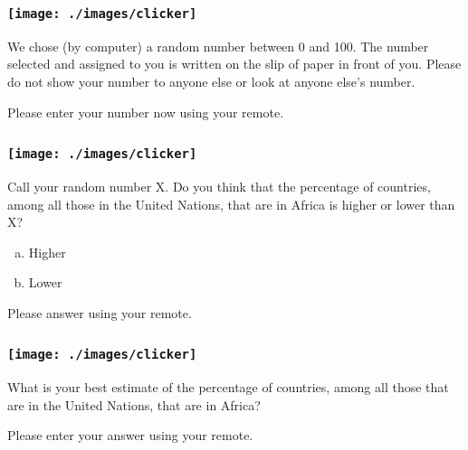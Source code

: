\begin{frame}

\frametitle{\texttt{[image: ./images/clicker]}}

We chose (by computer) a random number between 0 and 100. The number selected and assigned to you is written on the slip of paper in front of you. Please do not show your number to anyone else or look at anyone else's number.

\vspace{1em}

Please enter your number now using your remote.

\end{frame}



\begin{frame}

\frametitle{\texttt{[image: ./images/clicker]}}

Call your random number X. Do you think that the \alert{percentage} of countries, among all those in the United Nations, that are in Africa is \alert{higher} or \alert{lower} than X?

\begin{enumerate}[(a)]
	\item Higher
	\item Lower
\end{enumerate}

Please answer using your remote.

\end{frame}


\begin{frame}
\frametitle{\texttt{[image: ./images/clicker]}}
What is your best estimate of the \alert{percentage} of countries, among all those that are in the United Nations, that are in Africa?

\vspace{1em} Please enter your answer using your remote.

\end{frame}


%
%
%

